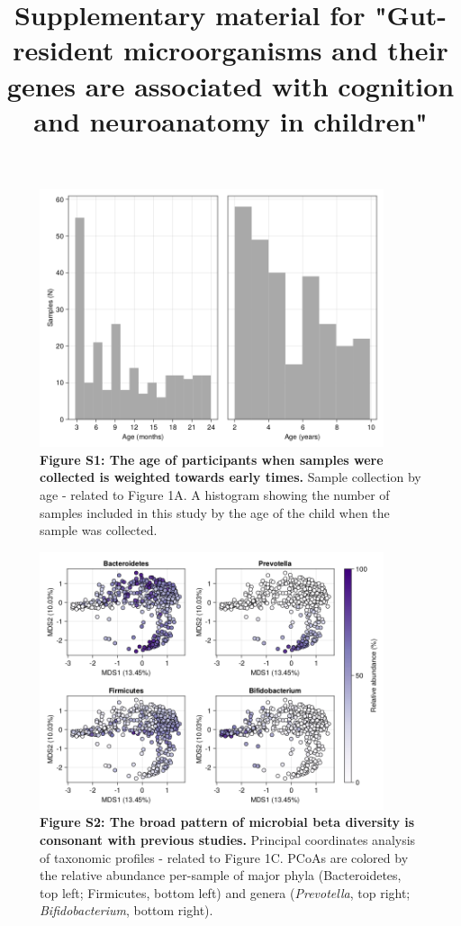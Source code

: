 \documentclass{article}
\title{Supplementary material for "Gut-resident microorganisms and their genes are associated with cognition and neuroanatomy in children"}
\begin{document}
\baselineskip24pt

\maketitle

\begin{figure}[h]
    \centering
    \includegraphics[width=0.9\textwidth]{assets/Supp_Figure1.png}
    \captionsetup{labelformat=empty}
    \caption{
        \textbf{Figure S1: The age of participants when samples were collected is weighted towards early times.} Sample collection by age - related to Figure 1A. A histogram showing the number of samples
        included in this study by the age of the child when the sample was collected.
    }
\end{figure}

\begin{figure}[h]
    \centering
    \includegraphics[width=0.9\textwidth]{assets/Supp_Figure2.png}
    \captionsetup{labelformat=empty}
    \caption{
        \textbf{Figure S2: The broad pattern of microbial beta diversity is consonant with previous studies.} Principal coordinates analysis of taxonomic profiles - 
        related to Figure 1C. PCoAs are colored by the relative abundance per-sample
        of major phyla (Bacteroidetes, top left; Firmicutes, bottom left)
        and genera (\textit{Prevotella}, top right; \textit{Bifidobacterium}, bottom right).
    }
\end{figure}
\end{document}

